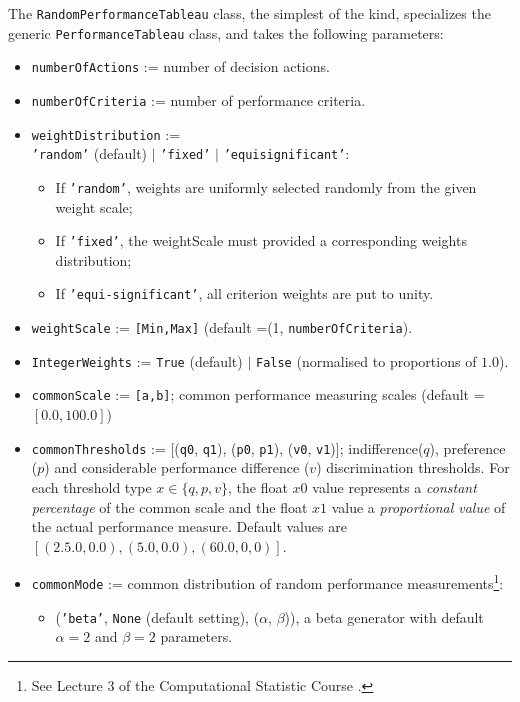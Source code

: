 The \texttt{RandomPerformanceTableau} class, the simplest of the kind, specializes the generic \texttt{PerformanceTableau} class, and takes the following parameters:
\begin{itemize}[leftmargin=0.5cm,rightmargin=0.5cm]
\item \texttt{numberOfActions} := number of decision actions.
\item \texttt{numberOfCriteria} := number of performance criteria.
\item \texttt{weightDistribution} := \\
   \texttt{'random'} (default) $|$ \texttt{'fixed'} $|$ \texttt{'equisignificant'}:
      \begin{itemize}[rightmargin=1cm,topsep=1pt]
         \item If \texttt{'random'}, weights are uniformly selected randomly from the given weight scale;
         \item If \texttt{'fixed'}, the weightScale must provided a corresponding weights distribution;
         \item If \texttt{'equi-significant'}, all criterion weights are put to unity.
      \end{itemize}
\item \texttt{weightScale} := \texttt{[Min,Max]} (default =(1, \texttt{numberOfCriteria}).
\item \texttt{IntegerWeights} := \texttt{True} (default) $|$ \texttt{False} (normalised to proportions of $1.0$).
\item \texttt{commonScale} := \texttt{[a,b]}; common performance measuring scales (default = $[0.0,100.0]$)
\item \texttt{commonThresholds} := [(\texttt{q0}, \texttt{q1}), (\texttt{p0}, \texttt{p1}), (\texttt{v0}, \texttt{v1})]; indifference($q$), preference ($p$) and considerable performance difference ($v$) discrimination thresholds. For each threshold type $x \in \{q,p,v\}$, the float $x0$ value represents a \emph{constant percentage} of the common scale and the float $x1$ value a \emph{proportional value} of the actual performance measure. Default values are $[(2.5.0,0.0), (5.0,0.0), (60.0,0,0)]$. 
\item \texttt{commonMode} := common distribution of random performance measurements\footnote{See Lecture 3 of the Computational Statistic Course \citep{CPSTAT-L3}.}:
      \begin{itemize}[rightmargin=1cm]
         \item (\texttt{'beta'}, \texttt{None} (default setting), ($\alpha$, $\beta$)), a beta generator with default $\alpha=2$ and $\beta=2$ parameters.

\end{itemize}
\end{itemize}
